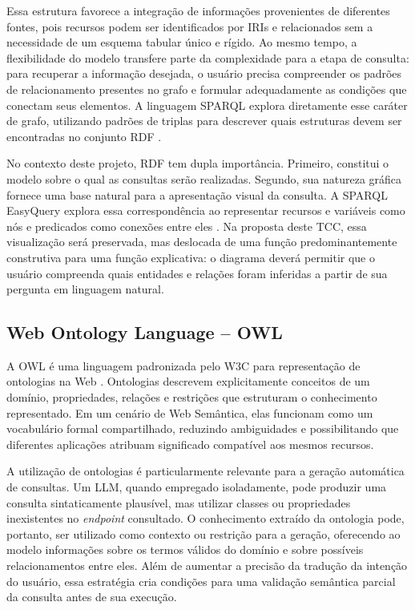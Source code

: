 \documentclass[10pt,a4paper]{article}
\begin{document}
Essa estrutura favorece a integração de informações provenientes de diferentes fontes, pois recursos podem ser identificados por IRIs e relacionados sem a necessidade de um esquema tabular único e rígido. Ao mesmo tempo, a flexibilidade do modelo transfere parte da complexidade para a etapa de consulta: para recuperar a informação desejada, o usuário precisa compreender os padrões de relacionamento presentes no grafo e formular adequadamente as condições que conectam seus elementos. A linguagem SPARQL explora diretamente esse caráter de grafo, utilizando padrões de triplas para descrever quais estruturas devem ser encontradas no conjunto RDF \cite{sparql2013}.

No contexto deste projeto, RDF tem dupla importância. Primeiro, constitui o modelo sobre o qual as consultas serão realizadas. Segundo, sua natureza gráfica fornece uma base natural para a apresentação visual da consulta. A SPARQL EasyQuery explora essa correspondência ao representar recursos e variáveis como nós e predicados como conexões entre eles \cite{easyquery}. Na proposta deste TCC, essa visualização será preservada, mas deslocada de uma função predominantemente construtiva para uma função explicativa: o diagrama deverá permitir que o usuário compreenda quais entidades e relações foram inferidas a partir de sua pergunta em linguagem natural.

\subsection{Web Ontology Language -- OWL}

A OWL é uma linguagem padronizada pelo W3C para representação de ontologias na Web \cite{owl2012}. Ontologias descrevem explicitamente conceitos de um domínio, propriedades, relações e restrições que estruturam o conhecimento representado. Em um cenário de Web Semântica, elas funcionam como um vocabulário formal compartilhado, reduzindo ambiguidades e possibilitando que diferentes aplicações atribuam significado compatível aos mesmos recursos.

A utilização de ontologias é particularmente relevante para a geração automática de consultas. Um LLM, quando empregado isoladamente, pode produzir uma consulta sintaticamente plausível, mas utilizar classes ou propriedades inexistentes no \textit{endpoint} consultado. O conhecimento extraído da ontologia pode, portanto, ser utilizado como contexto ou restrição para a geração, oferecendo ao modelo informações sobre os termos válidos do domínio e sobre possíveis relacionamentos entre eles. Além de aumentar a precisão da tradução da intenção do usuário, essa estratégia cria condições para uma validação semântica parcial da consulta antes de sua execução.
\end{document}
